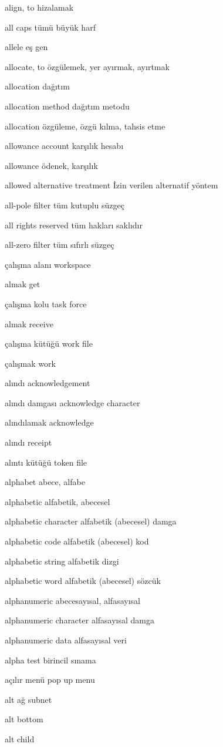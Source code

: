 \documentclass[12pt,fleqn]{article}\usepackage{../../common}
\begin{document}
align, to hizalamak

all caps tümü büyük harf

allele eş gen

allocate, to özgülemek, yer ayırmak, ayırtmak

allocation dağıtım

allocation method dağıtım metodu

allocation özgüleme, özgü kılma, tahsis etme

allowance account karşılık hesabı

allowance ödenek, karşılık

allowed alternative treatment İzin verilen alternatif yöntem

all-pole filter tüm kutuplu süzgeç

all rights reserved tüm hakları saklıdır

all-zero filter tüm sıfırlı süzgeç

çalışma alanı workspace

almak get

çalışma kolu task force

almak receive

çalışma kütüğü work file

çalışmak work

alındı acknowledgement

alındı damgası acknowledge character

alındılamak acknowledge

alındı receipt

alıntı kütüğü token file

alphabet abece, alfabe

alphabetic alfabetik, abecesel

alphabetic character alfabetik (abecesel) damga

alphabetic code alfabetik (abecesel) kod

alphabetic string alfabetik dizgi

alphabetic word alfabetik (abecesel) sözcük

alphanumeric abecesayısal, alfasayısal

alphanumeric character alfasayısal damga

alphanumeric data alfasayısal veri

alpha test birincil sınama

açılır menü pop up menu

alt ağ subnet

alt bottom

alt child
\end{document}
